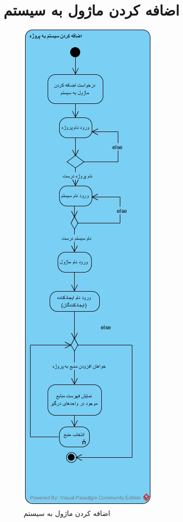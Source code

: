 \section{اضافه کردن ماژول به سیستم}
\begin{figure}[H]
	\centering
	\includegraphics[scale=0.8]{img/activity/addmodule}
	\caption{اضافه کردن ماژول به سیستم}
\end{figure}


